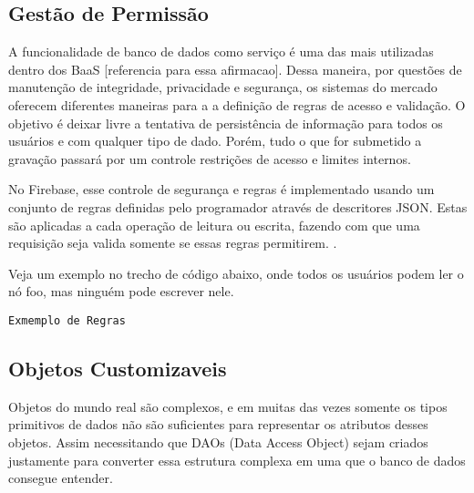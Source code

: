 
	\subsection{Gestão de Permissão} %
	\label{subsec:user_authorization}
	A funcionalidade de banco de dados como serviço é uma das mais utilizadas dentro dos BaaS [referencia para essa afirmacao]. Dessa maneira, por questões de manutenção de integridade, privacidade e segurança, os sistemas do mercado oferecem diferentes maneiras para a a definição de regras de acesso e validação. O objetivo é deixar livre a tentativa de persistência de informação para todos os usuários e com qualquer tipo de dado. Porém, tudo o que for submetido a gravação passará por um controle restrições de acesso e limites internos.
	
	No Firebase, esse controle de segurança e regras é implementado usando um conjunto de regras definidas pelo programador através de descritores JSON. Estas são aplicadas a cada operação de leitura ou escrita, fazendo com que uma requisição seja valida somente se essas regras permitirem. \cite{https://firebase.google.com/docs/database/security/}. 
	
	Veja um exemplo no trecho de código abaixo, onde todos os usuários podem ler o nó foo, mas ninguém pode escrever nele. 
	
	\begin{center}
 		\begin{minipage}{0.7\textwidth}
  			\begin{codigo}[H]
   				\small
   				\caption{\texttt{Exmemplo de Regras} }
   				\label{code:rules_example}
  			\end{codigo}
 		\end{minipage}
	\end{center}
	
	\subsection{Objetos Customizaveis}
	\label{subsec:custom_objects}
 	Objetos do mundo real são complexos, e em muitas das vezes somente os tipos primitivos de dados não são suficientes para representar os atributos desses objetos. Assim necessitando que DAOs (Data Access Object) sejam criados justamente para converter essa estrutura complexa em uma que o banco de dados consegue entender.

